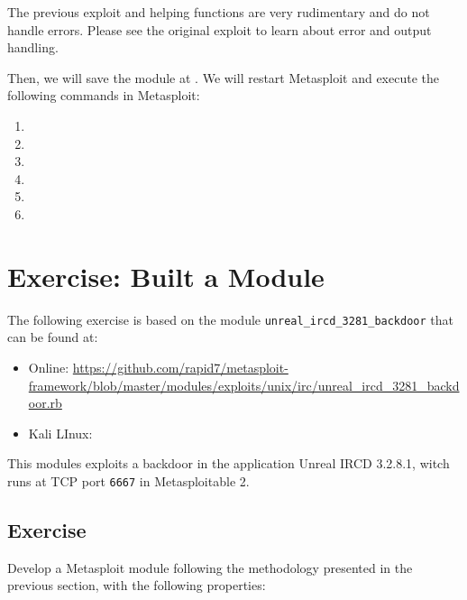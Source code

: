\begin{warnbox}
    The previous exploit and helping functions are very rudimentary and do not handle errors. Please see the original exploit to learn about error and output handling.
\end{warnbox}

Then, we will save the module at . We will restart Metasploit and execute the following commands in Metasploit: 

\begin{enumerate}
    \item {}
    \item {}
    \item {}
    \item {}
    \item {}
    \item {}
\end{enumerate}

\section{Exercise: Built a Module}

The following exercise is based on the module \texttt{unreal\_ircd\_3281\_backdoor} that can be found at:

\begin{itemize}
    \item Online: \url{https://github.com/rapid7/metasploit-framework/blob/master/modules/exploits/unix/irc/unreal\_ircd\_3281\_backdoor.rb}
    \item Kali LInux: 
\end{itemize}

This modules exploits a backdoor in the application Unreal IRCD 3.2.8.1, witch runs at TCP port \texttt{6667} in Metasploitable 2.

\subsection{Exercise}

Develop a Metasploit module following the methodology presented in the previous section, with the following properties:

